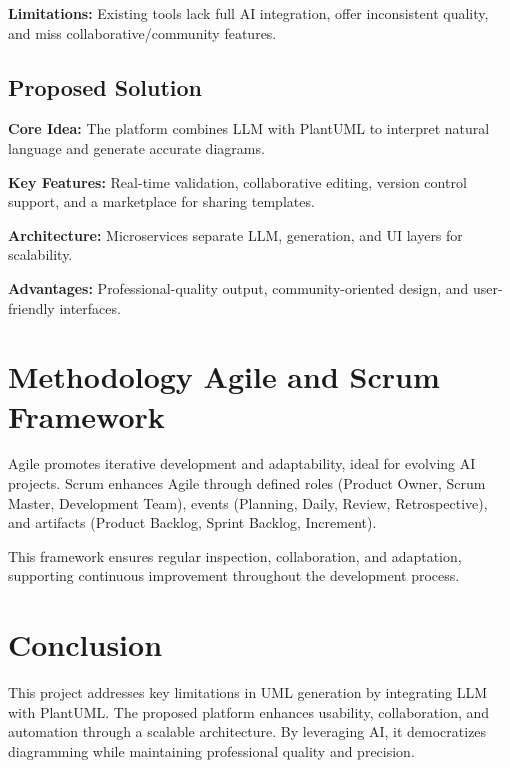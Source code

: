 \textbf{Limitations:} Existing tools lack full AI integration, offer inconsistent quality, and miss collaborative/community features.

\subsection{Proposed Solution}

\textbf{Core Idea:} The platform combines LLM with PlantUML to interpret natural language and generate accurate diagrams.

\textbf{Key Features:} Real-time validation, collaborative editing, version control support, and a marketplace for sharing templates.

\textbf{Architecture:} Microservices separate LLM, generation, and UI layers for scalability.

\textbf{Advantages:} Professional-quality output, community-oriented design, and user-friendly interfaces.


\section{Methodology Agile and Scrum Framework}

Agile promotes iterative development and adaptability, ideal for evolving AI projects. Scrum enhances Agile through defined roles (Product Owner, Scrum Master, Development Team), events (Planning, Daily, Review, Retrospective), and artifacts (Product Backlog, Sprint Backlog, Increment).

This framework ensures regular inspection, collaboration, and adaptation, supporting continuous improvement throughout the development process.


\section{Conclusion}
This project addresses key limitations in UML generation by integrating LLM with PlantUML.
The proposed platform enhances usability, collaboration, and automation through a scalable architecture.
By leveraging AI, it democratizes diagramming while maintaining professional quality and precision.

